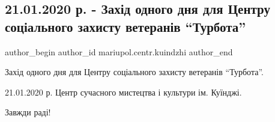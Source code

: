  
 
 
 
 

\subsection{21.01.2020 р. - Захід одного дня для Центру соціального захисту ветеранів \enquote{Турбота}}
\label{sec:22_01_2020.fb.mariupol.centr.kuindzhi.1.zaxid_odnogo_dnja_centr_zahystu_veteraniv_turbota}

\ifcmt
 author_begin
   author_id mariupol.centr.kuindzhi
 author_end
\fi

Захід одного дня для Центру соціального захисту ветеранів \enquote{Турбота}.

21.01.2020 р. Центр сучасного мистецтва і культури ім. Куїнджі.

Завжди раді!
